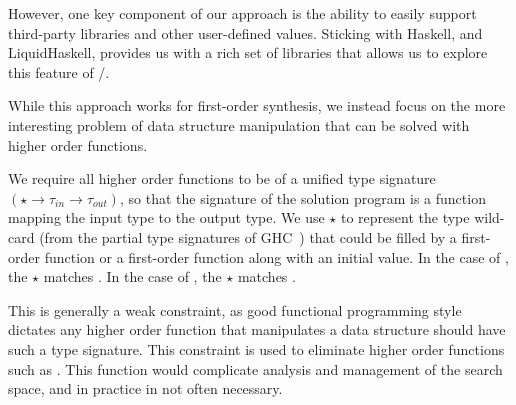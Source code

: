However, one key component of our approach is the ability to easily support third-party libraries and other user-defined values.
Sticking with Haskell, and LiquidHaskell, provides us with a rich set of libraries that allows us to explore this feature of \ourTool/.

While this approach works for first-order synthesis, we instead focus on the more interesting problem of data structure manipulation that can be solved with higher order functions.

We require all higher order functions to be of a unified type signature $(\star \to \tau_{in} \to \tau_{out})$, so that the signature of the solution program is a function mapping the input type to the output type. 
We use $\star$ to represent the type wild-card (from the partial type signatures of GHC~\cite{ghc}) that could be filled by a first-order function or a first-order function along with an initial value.
In the case of , the $\star$ matches .
In the case of , the $\star$ matches .

This is generally a weak constraint, as good functional programming style dictates any higher order function that manipulates a data structure should have such a type signature.
This constraint is used to eliminate higher order functions such as .
This function would complicate analysis and management of the search space, and in practice in not often necessary.




